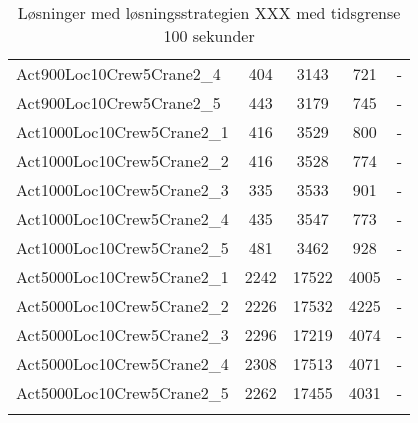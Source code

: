 \begin{center}
\begin{longtable}{ | l | c | c | c | c | }
Act900Loc10Crew5Crane2\_4	&	404	&	3143	&	721	&	-	\\	
Act900Loc10Crew5Crane2\_5	&	443	&	3179	&	745	&	-	\\
Act1000Loc10Crew5Crane2\_1	&	416	&	3529	&	800	&	-	\\	
Act1000Loc10Crew5Crane2\_2	&	416	&	3528	&	774	&	-	\\	
Act1000Loc10Crew5Crane2\_3	&	335	&	3533	&	901	&	-	\\	
Act1000Loc10Crew5Crane2\_4	&	435	&	3547	&	773	&	-	\\	
Act1000Loc10Crew5Crane2\_5	&	481	&	3462	&	928	&	-	\\
Act5000Loc10Crew5Crane2\_1	&	2242	&	17522	&	4005	&	-	\\	
Act5000Loc10Crew5Crane2\_2	&	2226	&	17532	&	4225	&	-	\\	
Act5000Loc10Crew5Crane2\_3	&	2296	&	17219	&	4074	&	-	\\	
Act5000Loc10Crew5Crane2\_4	&	2308	&	17513	&	4071	&	-	\\	
Act5000Loc10Crew5Crane2\_5	&	2262	&	17455	&	4031	&	-	\\		
\hline									
\caption{Løsninger med løsningsstrategien XXX med tidsgrense 100 sekunder}										
\label{tab:solutionAssignAltRFSTF100s}					
\end{longtable}									
\end{center}									